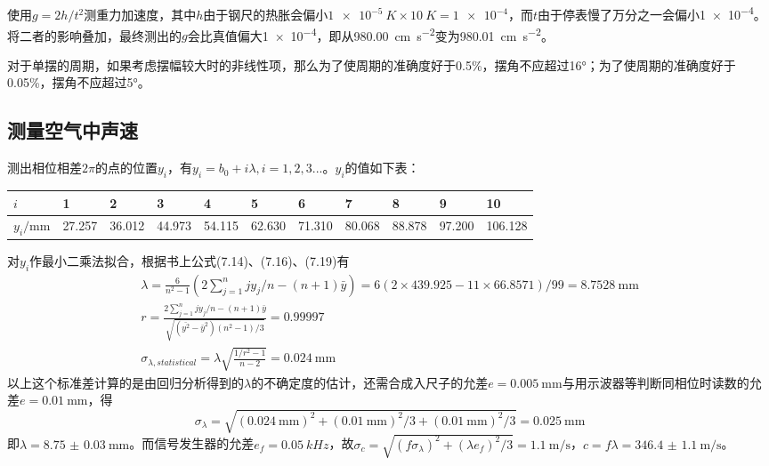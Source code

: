 \documentclass[UTF8]{ctexart}
\begin{document}
\subsection{}
使用$g=2h/t^2$测重力加速度，其中$h$由于钢尺的热胀会偏小$\SI{1e-5}{K}\times\SI{10}{K}=\num{1e-4}$，而$t$由于停表慢了万分之一会偏小\num{1e-4}。将二者的影响叠加，最终测出的$g$会比真值偏大\num{1e-4}，即从\SI{980.00}{\cm\per\second\squared}变为\SI{980.01}{\cm\per\second\squared}。

对于单摆的周期，如果考虑摆幅较大时的非线性项，那么为了使周期的准确度好于0.5\%，摆角不应超过\ang{16}；为了使周期的准确度好于0.05\%，摆角不应超过\ang{5}。
\subsection{测量空气中声速}
测出相位相差$2\pi$的点的位置$y_i$，有$y_i=b_0+i\lambda, i=1,2,3...$。$y_i$的值如下表：

\noindent\begin{tabu} to \linewidth {X|X X X X X X X X X X}
\hline
$i$ &1&2&3&4&5&6&7&8&9&10\\
\hline
$y_i/\si{\mm}$&27.257 &36.012 &44.973 &54.115 &62.630 &71.310 &80.068 &88.878 &97.200 &106.128\\
\hline
\end{tabu}

对$y_i$作最小二乘法拟合，根据书上公式(7.14)、(7.16)、(7.19)有
\begin{gather}
  \lambda=\frac{6}{n^2-1}(2\sum\limits_ {j=1}^{n}jy_j/n-(n+1)\bar{y})=6(2\times 439.925-11\times66.8571)/99=\SI{8.7528}{\mm}\\
  r=\frac{2\sum\limits_ {j=1}^{n}jy_j/n-(n+1)\bar{y}}{\sqrt{(\bar{y^2}-\bar{y}^2)(n^2-1)/3}}=0.99997\\
  \sigma_{\lambda,statistical}=\lambda\sqrt{\frac{1/r^2-1}{n-2}}=\SI{0.024}{\mm}
\end{gather}
以上这个标准差计算的是由回归分析得到的$\lambda$的不确定度的估计，还需合成入尺子的允差$e=\SI{0.005}{\mm}$与用示波器等判断同相位时读数的允差$e=\SI{0.01}{\mm}$，得
\begin{equation}
  \sigma_{\lambda}=\sqrt{(\SI{0.024}{\mm})^2+(\SI{0.01}{\mm})^2/3+(\SI{0.01}{\mm})^2/3}=\SI{0.025}{\mm}
\end{equation}
即$\lambda=\SI{8.75(3)}{\mm}$。而信号发生器的允差$e_f=\SI{0.05}{kHz}$，故$\sigma_c=\sqrt{(f\sigma_{\lambda})^2+(\lambda e_f)^2/3}=\SI{1.1}{\meter\per\second}$，$c=f\lambda=\SI{346.4(11)}{\meter\per\second}$。
\end{document}
